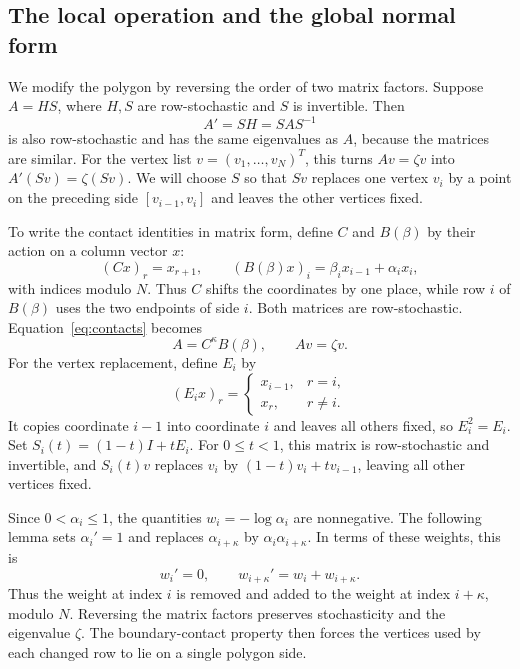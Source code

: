\documentclass[11pt,a4paper]{article}
\theoremstyle{definition}
\theoremstyle{remark}
\numberwithin{equation}{section}
\begin{document}
\subsection{The local operation and the global normal form}
We modify the polygon by reversing the order of two matrix factors. Suppose $A=HS$, where $H,S$ are row-stochastic and $S$ is invertible. Then
\[
 A'=SH=SAS^{-1}
\]
is also row-stochastic and has the same eigenvalues as $A$, because the matrices are similar. For the vertex list $v=(v_1,\ldots,v_N)^T$, this turns $Av=\zeta v$ into $A'(Sv)=\zeta(Sv)$. We will choose $S$ so that $Sv$ replaces one vertex $v_i$ by a point on the preceding side $[v_{i-1},v_i]$ and leaves the other vertices fixed.

To write the contact identities in matrix form, define $C$ and $B(\beta)$ by their action on a column vector $x$:
\[
 (Cx)_r=x_{r+1},\qquad
 (B(\beta)x)_i=\beta_i x_{i-1}+\alpha_i x_i,
\]
with indices modulo $N$. Thus $C$ shifts the coordinates by one place, while row $i$ of $B(\beta)$ uses the two endpoints of side $i$. Both matrices are row-stochastic. Equation~\eqref{eq:contacts} becomes
\[
 A=C^\kappa B(\beta),\qquad Av=\zeta v.
\]
For the vertex replacement, define $E_i$ by
\[
 (E_i x)_r=
 \begin{cases}
 x_{i-1},&r=i,\\
 x_r,&r\ne i.
 \end{cases}
\]
It copies coordinate $i-1$ into coordinate $i$ and leaves all others fixed, so $E_i^2=E_i$. Set $S_i(t)=(1-t)I+tE_i$. For $0\le t<1$, this matrix is row-stochastic and invertible, and $S_i(t)v$ replaces $v_i$ by $(1-t)v_i+t v_{i-1}$, leaving all other vertices fixed.

Since $0<\alpha_i\le1$, the quantities $w_i=-\log\alpha_i$ are nonnegative. The following lemma sets $\alpha_i'=1$ and replaces $\alpha_{i+\kappa}$ by $\alpha_i\alpha_{i+\kappa}$. In terms of these weights, this is
\[
 w_i'=0,\qquad w_{i+\kappa}'=w_i+w_{i+\kappa}.
\]
Thus the weight at index $i$ is removed and added to the weight at index $i+\kappa$, modulo $N$. Reversing the matrix factors preserves stochasticity and the eigenvalue $\zeta$. The boundary-contact property then forces the vertices used by each changed row to lie on a single polygon side.
\end{document}
